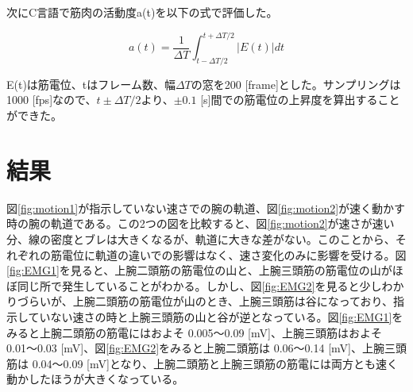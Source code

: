 \documentclass{jsarticle}
\begin{document}
次にC言語で筋肉の活動度a(t)を以下の式で評価した。

\begin{equation}
a(t)=\frac{1}{\Delta{T}}\int^{t+\Delta{T}/2}_{t-\Delta{T}/2} |E(t)|dt
\end{equation}

E(t)は筋電位、tはフレーム数、幅$\Delta{T}$の窓を200 [frame]とした。サンプリングは1000 [fps]なので、$t\pm\Delta{T}/2$より、$\pm0.1$ [s]間での筋電位の上昇度を算出することができた。

\section{結果}

図\ref{fig:motion1}が指示していない速さでの腕の軌道、図\ref{fig:motion2}が速く動かす時の腕の軌道である。この2つの図を比較すると、図\ref{fig:motion2}が速さが速い分、線の密度とブレは大きくなるが、軌道に大きな差がない。このことから、それぞれの筋電位に軌道の違いでの影響はなく、速さ変化のみに影響を受ける。図\ref{fig:EMG1}を見ると、上腕二頭筋の筋電位の山と、上腕三頭筋の筋電位の山がほぼ同じ所で発生していることがわかる。しかし、図\ref{fig:EMG2}を見ると少しわかりづらいが、上腕二頭筋の筋電位が山のとき、上腕三頭筋は谷になっており、指示していない速さの時と上腕三頭筋の山と谷が逆となっている。図\ref{fig:EMG1}をみると上腕二頭筋の筋電にはおよそ 0.005〜0.09 [mV]、上腕三頭筋はおよそ 0.01〜0.03 [mV]、図\ref{fig:EMG2}をみると上腕二頭筋は 0.06〜0.14 [mV]、上腕三頭筋は 0.04〜0.09 [mV]となり、上腕二頭筋と上腕三頭筋の筋電には両方とも速く動かしたほうが大きくなっている。
\end{document}
